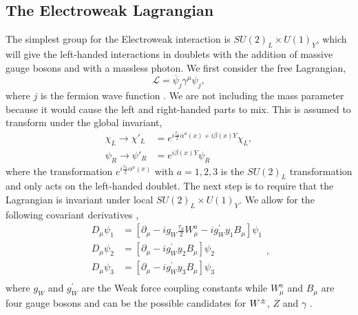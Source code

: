 \subsection{The Electroweak Lagrangian}

The simplest group for the Electroweak interaction is $SU(2)_L\times U(1)_Y$, which will give the left-handed interactions in doublets with the addition of massive gauge bosons \W{} and \Z{} with a massless photon. We first consider the free Lagrangian,
\begin{equation}\label{WeakL}
\mathcal{L}=\overline{\psi}_j\gamma^\mu\psi_j,
\end{equation}
where $j$ is the fermion wave function \cite{halzen_quarks_1984, griffiths_introduction_2008}. We are not including the mass parameter because it would cause the left and right-handed parts to mix.  This is assumed to transform under the global invariant,
\begin{equation}\label{WeakGlobal}
\begin{split}
\chi_L\rightarrow\chi'_L&=e^{i\frac{\tau_a}{2}\alpha^a(x)+i\beta(x)Y}\chi_L, \\
\psi_R\rightarrow\psi'_R&=e^{i\beta(x)Y}\psi_R
\end{split}
\end{equation}
where the transformation $e^{i\frac{\tau_a}{2}\alpha^a(x)}$ with $a = 1, 2, 3$ is the $SU(2)_L$ transformation and only acts on the left-handed doublet. The next step is to require that the Lagrangian is invariant under local $SU(2)_L\times U(1)_Y$. We allow for the following covariant derivatives \cite{halzen_quarks_1984},
\begin{equation}
\begin{split}
D_\mu\psi_1&=[\partial_\mu-ig_W\frac{\tau_a}{2}W_\mu^a-ig_W^\prime y_1 B_\mu]\psi_1 \\
D_\mu\psi_2&=[\partial_\mu-ig_W^\prime y_2 B_\mu]\psi_2 \\
D_\mu\psi_3&=[\partial_\mu-ig_W^\prime y_3 B_\mu]\psi_3 \\
\end{split},
\end{equation}
where $g_W$ and $g_W^{\prime}$ are the Weak force coupling constants while $W_\mu^a$ and $B_\mu$ are four gauge bosons and can be the possible candidates for $W^\pm$, $Z$ and $\gamma$ \cite{halzen_quarks_1984, griffiths_introduction_2008}. 

